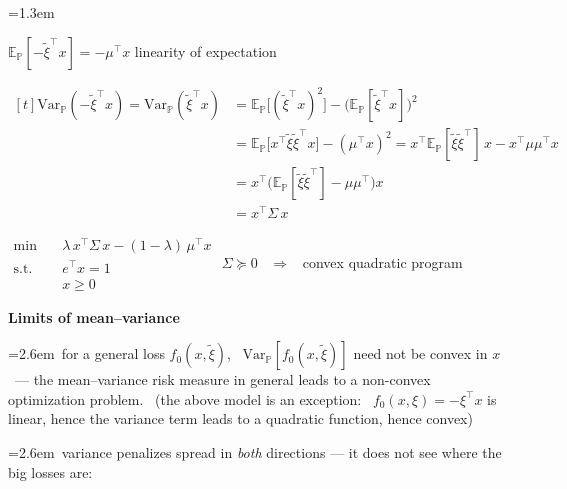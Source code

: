 \documentclass[10pt]{article}
\newenvironment{board}{%
  \par\vspace{4pt}
  \begingroup\leftskip=1.3em\relax\parskip=2pt\relax}{%
  \par\endgroup\vspace{4pt}}
\newcommand{\bul}{\hangindent=2.6em\hangafter=1\hspace{1.2em}\textbullet\ \ignorespaces}
\newcommand{\E}{\mathbb{E}}
\newcommand{\Prob}{\mathbb{P}}
\newcommand{\xit}{\tilde\xi}
\begin{document}
\begin{board}
\begin{center}
{{\quad $\E_{\Prob}[-\xit^{\top}x] = -\mu^{\top}x$ \qquad linearity of expectation
\vspace{6pt}

\quad $\begin{aligned}[t]
  \mathrm{Var}_{\Prob}(-\xit^{\top}x) = \mathrm{Var}_{\Prob}(\xit^{\top}x)
    &= \E_{\Prob}\big[(\xit^{\top}x)^2\big] - \big(\E_{\Prob}[\xit^{\top}x]\big)^2 \\
    &= \E_{\Prob}\big[x^{\top}\xit\xit^{\top}x\big] - (\mu^{\top}x)^2
     = x^{\top}\E_{\Prob}[\xit\xit^{\top}]\,x - x^{\top}\mu\mu^{\top}x \\
    &= x^{\top}\big(\E_{\Prob}[\xit\xit^{\top}] - \mu\mu^{\top}\big)x \\
    &= x^{\top}\Sigma\,x
\end{aligned}$
\vspace{8pt}

\begin{center}
$\begin{aligned}
  \min\quad & \lambda\,x^{\top}\Sigma\,x - (1-\lambda)\,\mu^{\top}x \\
  \text{s.t.}\quad & e^{\top}x = 1 \\
                   & x \ge 0
\end{aligned}$
\qquad $\Sigma \succeq 0$ \ $\Rightarrow$ \ convex quadratic program
\end{center}
}}
\end{center}
\vspace{6pt}

\textbf{Limits of mean--variance}
\vspace{4pt}

\bul for a general loss $f_0(x, \xit)$, \ $\mathrm{Var}_{\Prob}[f_0(x, \xit)]$ need not be convex in $x$ \ --- the mean--variance
risk measure in general leads to a non-convex optimization problem. \ (the above model is an exception: \ $f_0(x, \xi) = -\xi^{\top}x$ is linear, hence the variance term leads to a quadratic function, hence convex)
\vspace{6pt}

\bul variance penalizes spread in \emph{both} directions --- it does not see where the big losses are:
\vspace{4pt}

\begin{center}
\end{center}
\vspace{-2pt}


\end{board}
\end{document}
